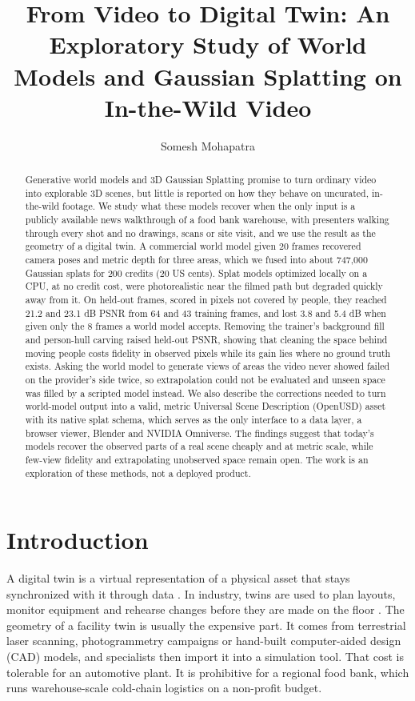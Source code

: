 \documentclass{article}
\title{From Video to Digital Twin: An Exploratory Study of World Models and Gaussian Splatting on In-the-Wild Video}
\author[1*]{Somesh Mohapatra}
\affil[1]{Independent Researcher.}
\affil[*]{Address correspondence to: pikulsomesh@gmail.com}
\date{}
\begin{document}
\maketitle

\begin{abstract}
Generative world models and 3D Gaussian Splatting promise to turn ordinary
video into explorable 3D scenes, but little is reported on how they behave on
uncurated, in-the-wild footage. We study what these models recover when the
only input is a publicly available news walkthrough of a food bank warehouse,
with presenters walking through every shot and no drawings, scans or site
visit, and we use the result as the geometry of a digital twin. A commercial
world model given 20 frames recovered camera poses and metric depth for three
areas, which we fused into about 747,000 Gaussian splats for 200 credits (20
US cents). Splat models optimized locally on a CPU, at no credit cost, were
photorealistic near the filmed path but degraded quickly away from it. On
held-out frames, scored in pixels not covered by people, they reached 21.2 and
23.1 dB PSNR from 64 and 43 training frames, and lost 3.8 and 5.4 dB when
given only the 8 frames a world model accepts. Removing the trainer's background fill and person-hull
carving raised held-out PSNR, showing that cleaning the space behind moving
people costs fidelity in observed pixels while its gain lies where no ground
truth exists. Asking the world model to generate views of areas the video
never showed failed on the provider's side twice, so extrapolation could not
be evaluated and unseen space was filled by a scripted model instead. We also
describe the corrections needed to turn world-model output into a valid,
metric Universal Scene Description (OpenUSD) asset with its native splat
schema, which serves as the only
interface to a data layer, a browser viewer, Blender and NVIDIA Omniverse. The
findings suggest that today's models recover the observed parts of a real
scene cheaply and at metric scale, while few-view fidelity and extrapolating
unobserved space remain open. The work is an exploration of these methods,
not a deployed product.
\end{abstract}


\section{Introduction}
A digital twin is a virtual representation of a physical asset that stays
synchronized with it through data \cite{grieves2017digital,kritzinger2018digital}.
In industry, twins are used to plan layouts, monitor equipment and rehearse
changes before they are made on the floor \cite{tao2019digital,fuller2020digital}.
The geometry of a facility twin is usually the expensive part. It comes from
terrestrial laser scanning, photogrammetry campaigns or hand-built
computer-aided design (CAD) models, and specialists then import it into a
simulation tool. That cost is tolerable for an automotive plant. It is
prohibitive for a regional food bank, which runs warehouse-scale cold-chain
logistics on a non-profit budget.
\end{document}

